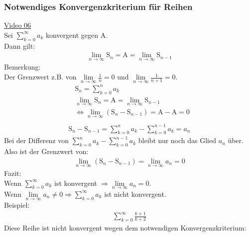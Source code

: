 \subsubsection{Notwendiges Konvergenzkriterium für Reihen}
\href{https://youtu.be/l_l4p0D7qro}{Video 06}\\
Sei $ \sum\limits_{k=0}^{\infty}a_k $ konvergent gegen $ \mathrm{A} $.\\
Dann gilt:\\
\begin{align*}
\lim\limits_ {n\to\infty}\mathrm{S}_n=\mathrm{A}=\lim\limits_ {n\to\infty}\mathrm{S}_{n-1}
\end{align*}
Bemerkung:\\
Der Grenzwert z.B. von $ \lim\limits_ {n\to\infty}\frac{1}{n}= 0 $ und $ \lim\limits_ {n\to\infty}\frac{1}{n+1}=0 $.\\
\begin{align*}
&\mathrm{S}_n=\sum\limits_{k=0}^{n}a_k\\
&\lim\limits_ {n\to\infty}\mathrm{S}_n=\mathrm{A}=\lim\limits_ {n\to\infty}\mathrm{S}_{n-1}\\
&\Leftrightarrow \lim\limits_ {n\to\infty}(\mathrm{S}_n-\mathrm{S}_{n-1})=\mathrm{A}-\mathrm{A}=0\\
\end{align*}
\begin{align*}
\mathrm{S}_n-\mathrm{S}_{n-1}=\sum\limits_{k=0}^{n}a_k-\sum\limits_{k=0}^{n-1}a_k=a_n
\end{align*}
Bei der Differenz von $ \sum\limits_{k=0}^{n}a_k-\sum\limits_{k=0}^{n-1}a_k $ bleibt nur noch das Glied $ a_n $ über.\\
Also ist der Grenzwert von:\\
\begin{align*}
\lim\limits_ {n\to\infty}(\mathrm{S}_n-\mathrm{S}_{n-1})=\lim\limits_ {n\to\infty}a_n=0
\end{align*}
Fazit:\\
Wenn $ \sum\limits_{k=0}^{\infty}a_k $ ist konvergent $ \Rightarrow \lim\limits_ {n\to\infty}a_n=0$.\\
Wenn $ \lim\limits_ {n\to\infty}a_n\neq 0\Rightarrow\sum\limits_{k=0}^{\infty}a_k $ ist nicht konvergent.\\
\newpage
\noindent
Beispiel:\\
\begin{align*}
\sum\limits_{k=0}^{\infty}\frac{k+1}{k+2}
\end{align*}
Diese Reihe ist nicht konvergent wegen dem notwendigen Konvergenzkriterium:\\
